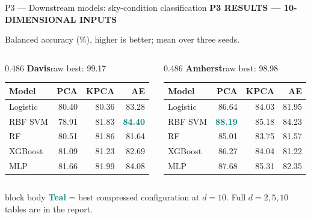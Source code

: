 \documentclass[aspectratio=169,11pt]{beamer}
\newcommand{\sectiontag}[1]{{\footnotesize\usebeamercolor[fg]{structure}\textbf{#1}}\par\vspace{0.10cm}}
\newcommand{\smallmuted}[1]{{\footnotesize\color{slate}#1\par}}
\begin{document}
\begin{frame}{P3 — Downstream models: sky-condition classification}
\sectiontag{P3 \quad RESULTS — 10-DIMENSIONAL INPUTS}
\smallmuted{Balanced accuracy (\%), higher is better; mean over three seeds.}\vspace{0.18cm}
\begin{columns}[T,onlytextwidth]
\begin{column}{0.486\textwidth}
\textbf{Davis}\hfill{\scriptsize raw best: 99.17}\par\vspace{0.12cm}
{\fontsize{8.8}{10.4}\selectfont
\setlength{\tabcolsep}{3.9pt}
\renewcommand{\arraystretch}{1.39}
\begin{tabular}{@{}lrrr@{}}\toprule
\textbf{Model} & \textbf{PCA} & \textbf{KPCA} & \textbf{AE}\\\midrule
Logistic & 80.40 & 80.36 & 83.28\\
RBF SVM & 78.91 & 81.83 & \textcolor{teal}{\textbf{84.40}}\\
RF & 80.51 & 81.86 & 81.64\\
XGBoost & 81.09 & 81.23 & 82.69\\
MLP & 81.66 & 81.99 & 84.08\\
\bottomrule\end{tabular}}
\end{column}
\begin{column}{0.486\textwidth}
\textbf{Amherst}\hfill{\scriptsize raw best: 98.98}\par\vspace{0.12cm}
{\fontsize{8.8}{10.4}\selectfont
\setlength{\tabcolsep}{3.9pt}
\renewcommand{\arraystretch}{1.39}
\begin{tabular}{@{}lrrr@{}}\toprule
\textbf{Model} & \textbf{PCA} & \textbf{KPCA} & \textbf{AE}\\\midrule
Logistic & 86.64 & 84.03 & 81.95\\
RBF SVM & \textcolor{teal}{\textbf{88.19}} & 85.18 & 84.23\\
RF & 85.01 & 83.75 & 81.57\\
XGBoost & 86.27 & 84.04 & 81.22\\
MLP & 87.68 & 85.31 & 82.35\\
\bottomrule\end{tabular}}
\end{column}
\end{columns}
\vspace{0.30cm}
\begin{beamercolorbox}[wd=\linewidth,sep=0.14cm]{block body}
\footnotesize \textcolor{teal}{\textbf{Teal}} = best compressed configuration at $d=10$. Full $d=2,5,10$ tables are in the report.
\end{beamercolorbox}
\end{frame}
\end{document}

